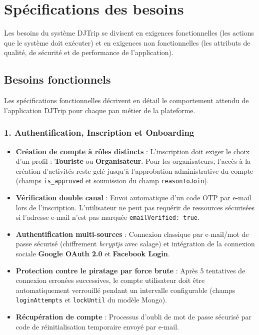\documentclass[12pt,a4paper]{report}
\begin{document}
\section{Spécifications des besoins}
Les besoins du système DJTrip se divisent en exigences fonctionnelles (les actions que le système doit exécuter) et en exigences non fonctionnelles (les attributs de qualité, de sécurité et de performance de l'application).

\subsection{Besoins fonctionnels}
Les spécifications fonctionnelles décrivent en détail le comportement attendu de l'application DJTrip pour chaque pan métier de la plateforme.

\subsubsection{1. Authentification, Inscription et Onboarding}
\begin{itemize}[label=\textbullet]
    \item \textbf{Création de compte à rôles distincts} : L'inscription doit exiger le choix d'un profil : \textbf{Touriste} ou \textbf{Organisateur}. Pour les organisateurs, l'accès à la création d'activités reste gelé jusqu'à l'approbation administrative du compte (champs \texttt{is\_approved} et soumission du champ \texttt{reasonToJoin}).
    \item \textbf{Vérification double canal} : Envoi automatique d'un code OTP par e-mail lors de l'inscription. L'utilisateur ne peut pas requérir de ressources sécurisées si l'adresse e-mail n'est pas marquée \texttt{emailVerified: true}.
    \item \textbf{Authentification multi-sources} : Connexion classique par e-mail/mot de passe sécurisé (chiffrement \textit{bcryptjs} avec salage) et intégration de la connexion sociale \textbf{Google OAuth 2.0} et \textbf{Facebook Login}.
    \item \textbf{Protection contre le piratage par force brute} : Après 5 tentatives de connexion erronées successives, le compte utilisateur doit être automatiquement verrouillé pendant un intervalle configurable (champs \texttt{loginAttempts} et \texttt{lockUntil} du modèle Mongo).
    \item \textbf{Récupération de compte} : Processus d'oubli de mot de passe sécurisé par code de réinitialisation temporaire envoyé par e-mail.
\end{itemize}
\end{document}
